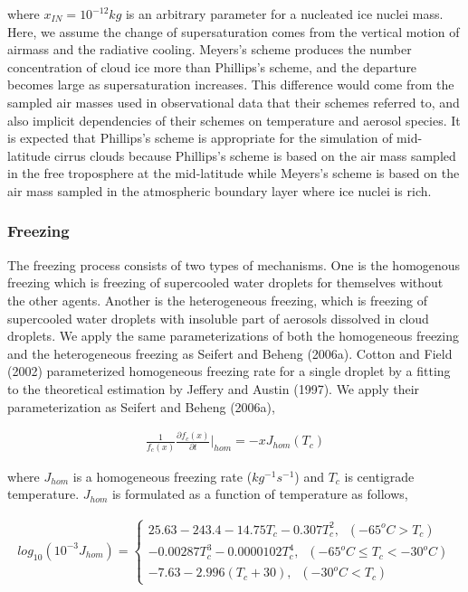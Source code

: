 where $x_{IN} = 10^{-12} kg$ is an arbitrary parameter for a nucleated ice nuclei mass. Here, we assume the change of supersaturation comes from the vertical motion of airmass and the radiative cooling. Meyers’s scheme produces the number concentration of cloud ice more than Phillips’s scheme, and the departure becomes large as supersaturation increases. This difference would come from the sampled air masses used in observational data that their schemes referred to, and also implicit dependencies of their schemes on temperature and aerosol species. It is expected that Phillips’s scheme is appropriate for the simulation of mid-latitude cirrus clouds because Phillips’s scheme is based on the air mass sampled in the free troposphere at the mid-latitude while Meyers’s scheme is based on the air mass sampled in the atmospheric boundary layer where ice nuclei is rich.

\subsubsection{Freezing}
The freezing process consists of two types of mechanisms. One is the homogenous freezing which is freezing of supercooled water droplets for themselves without the other agents. Another is the heterogeneous freezing, which is freezing of supercooled water droplets with insoluble part of aerosols dissolved in cloud droplets. We apply the same parameterizations of both the homogeneous freezing and the heterogeneous freezing as Seifert and Beheng (2006a). Cotton and Field (2002) parameterized homogeneous freezing rate for a single droplet by a fitting to the theoretical estimation by Jeffery and Austin (1997). We apply their parameterization as Seifert and Beheng (2006a),

\begin{eqnarray}
\frac{1}{f_{c}(x)}\frac{\partial f_{c}(x)}{\partial t}\Bigr|_{hom}=-xJ_{hom}(T_{c})\label{sn120}
\end{eqnarray}

where $J_{hom}$ is a homogeneous freezing rate ($kg^{-1}s^{-1}$) and $T_{c}$ is centigrade temperature. $J_{hom}$ is formulated as a function of temperature as follows,

\begin{eqnarray}
log_{10}(10^{-3}J_{hom})=
\left\{
\begin{array}{l}
25.63-243.4-14.75T_{c}-0.307T_{c}^{2},\;\;(-65^{o}C>T_{c}) \nonumber \\
-0.00287T_{c}^{3}-0.0000102T_{c}^{4},\;\;(-65^{o}C\leq T_{c}<-30^{o}C)\nonumber \\
-7.63-2.996(T_{c}+30),\;\;(-30^{o}C< T_{c})\nonumber 
\end{array}
\label{sn121}
\right.
\end{eqnarray}

